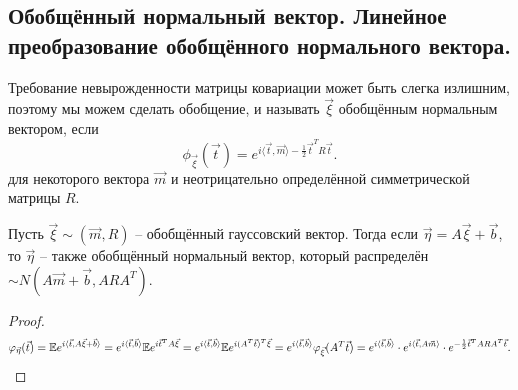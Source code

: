 \subsection{Обобщённый нормальный вектор. Линейное преобразование обобщённого нормального вектора.}
\begin{definition}
    Требование невырожденности матрицы ковариации может быть слегка излишним, поэтому мы можем сделать обобщение, и называть $\vec{\xi}$ обобщённым нормальным вектором, если
    \[
        \phi_{\vec{\xi}}(\vec{t}) = e^{i \langle \vec{t}, \vec{m} \rangle - \frac{1}{2}\vec{t}^T R \vec{t}}.
    \]
    для некоторого вектора $\vec{m}$ и неотрицательно определённой симметрической матрицы $R$.
\end{definition}
\begin{lemma}
    Пусть $\vec{\xi} \sim (\vec{m}, R)$ -- обобщённый гауссовский вектор. Тогда если $\vec{\eta} = A\vec{\xi} + \vec{b}$, то
    $\vec{\eta}$ -- также обобщённый нормальный вектор, который распределён $\sim N(A\vec{m} + \vec{b}, ARA^T)$.
\end{lemma}
\begin{proof}
    \[
        \varphi_{\vec{\eta}}(\vec{t}) = \mathbb{E} e^{i \langle \vec{t}, A\vec{\xi} + \vec{b} \rangle} = e^{i\langle \vec{t}, \vec{b} \rangle} \mathbb{E} e^{i \vec{t}^T A \vec{\xi}} = e^{i\langle \vec{t}, \vec{b} \rangle} \mathbb{E} e^{i (A^T\vec{t})^T \vec{\xi}}
        = e^{i \langle \vec{t}, \vec{b} \rangle} \varphi_{\vec{\xi}}(A^T \vec{t}) = e^{i \langle \vec{t}, \vec{b} \rangle} \cdot e^{i \langle \vec{t}, A\vec{m} \rangle} \cdot e^{-\frac{1}{2} \vec{t}^T ARA^T \vec{t}}.
    \]
\end{proof}